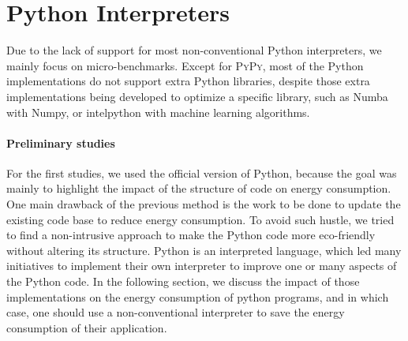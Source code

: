 \section{Python Interpreters}\label{sec:pythoninterpreters}
Due to the lack of support for most non-conventional Python interpreters, we mainly focus on micro-benchmarks.
Except for \textsc{PyPy}, most of the Python implementations do not support extra Python libraries, despite those extra implementations being developed to optimize a specific library, such as \textsf{Numba} with \textsf{Numpy}, or \textsf{intelpython} with machine learning algorithms.

\paragraph{Preliminary studies}
For the first studies, we used the official version of Python, because the goal was mainly to highlight the impact of the structure of code on energy consumption.
One main drawback of the previous method is the work to be done to update the existing code base to reduce  energy consumption.
To avoid such hustle, we tried to find a non-intrusive approach to make the Python code more eco-friendly without altering its structure.
Python is an interpreted language, which led many initiatives to implement their own interpreter to improve one or many aspects of the Python code.
In the following section, we discuss the impact of those implementations on the energy consumption of python programs, and in which case, one should use a non-conventional interpreter to save the energy consumption of their application.

